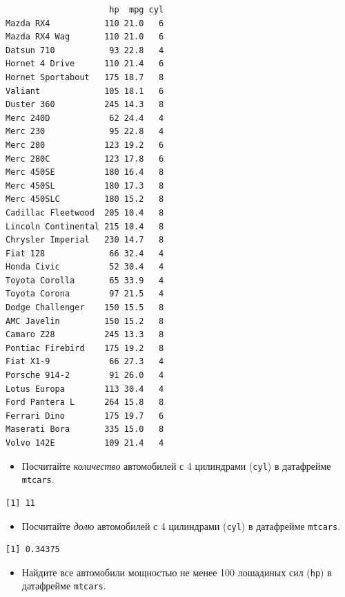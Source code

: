 \documentclass[
]{book}
\providecommand{\tightlist}{%
  \setlength{\itemsep}{0pt}\setlength{\parskip}{0pt}}
\begin{document}
\begin{verbatim}
                     hp  mpg cyl
Mazda RX4           110 21.0   6
Mazda RX4 Wag       110 21.0   6
Datsun 710           93 22.8   4
Hornet 4 Drive      110 21.4   6
Hornet Sportabout   175 18.7   8
Valiant             105 18.1   6
Duster 360          245 14.3   8
Merc 240D            62 24.4   4
Merc 230             95 22.8   4
Merc 280            123 19.2   6
Merc 280C           123 17.8   6
Merc 450SE          180 16.4   8
Merc 450SL          180 17.3   8
Merc 450SLC         180 15.2   8
Cadillac Fleetwood  205 10.4   8
Lincoln Continental 215 10.4   8
Chrysler Imperial   230 14.7   8
Fiat 128             66 32.4   4
Honda Civic          52 30.4   4
Toyota Corolla       65 33.9   4
Toyota Corona        97 21.5   4
Dodge Challenger    150 15.5   8
AMC Javelin         150 15.2   8
Camaro Z28          245 13.3   8
Pontiac Firebird    175 19.2   8
Fiat X1-9            66 27.3   4
Porsche 914-2        91 26.0   4
Lotus Europa        113 30.4   4
Ford Pantera L      264 15.8   8
Ferrari Dino        175 19.7   6
Maserati Bora       335 15.0   8
Volvo 142E          109 21.4   4
\end{verbatim}

\begin{itemize}
\tightlist
\item
  Посчитайте \emph{количество} автомобилей с 4 цилиндрами (\texttt{cyl}) в датафрейме \texttt{mtcars}.
\end{itemize}

\begin{verbatim}
[1] 11
\end{verbatim}

\begin{itemize}
\tightlist
\item
  Посчитайте \emph{долю} автомобилей с 4 цилиндрами (\texttt{cyl}) в датафрейме \texttt{mtcars}.
\end{itemize}

\begin{verbatim}
[1] 0.34375
\end{verbatim}

\begin{itemize}
\tightlist
\item
  Найдите все автомобили мощностью не менее 100 лошадиных сил (\texttt{hp}) в датафрейме \texttt{mtcars}.
\end{itemize}
\end{document}
